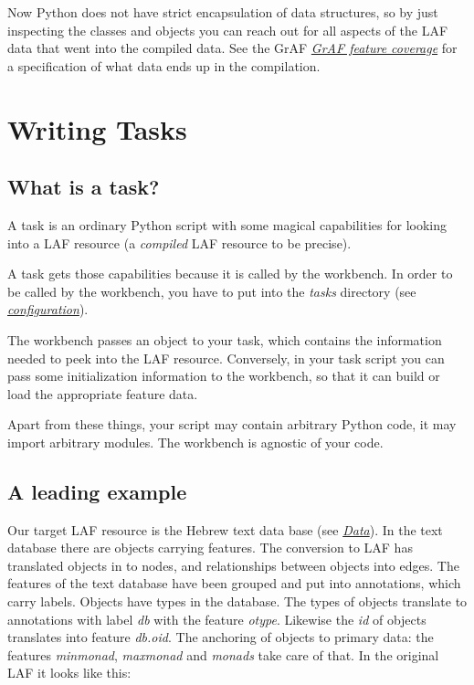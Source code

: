 \documentclass[letterpaper,10pt,english]{sphinxmanual}
\begin{document}
Now Python does not have strict encapsulation of data structures,
so by just inspecting the classes and objects you can reach out
for all aspects of the LAF data that went into the compiled data.
See the GrAF {\hyperref[workbench:feature-coverage]{\emph{GrAF feature coverage}}} for a specification of what data ends up in the compilation.


\chapter{Writing Tasks}
\label{taskwriting:writing-tasks}\label{taskwriting::doc}

\section{What is a task?}
\label{taskwriting:what-is-a-task}
A task is an ordinary Python script with some magical capabilities
for looking into a LAF resource (a \emph{compiled} LAF resource to be precise).

A task gets those capabilities because it is called by the workbench.
In order to be called by the workbench, you have to put into the \emph{tasks} directory
(see {\hyperref[workbench:task-dir]{\emph{configuration}}}).

The workbench passes an object to your task,
which contains the information needed to peek into the LAF resource.
Conversely, in your task script you can pass some initialization information to the workbench,
so that it can build or load the appropriate feature data.

Apart from these things, your script may contain arbitrary Python code,
it may import arbitrary modules.
The workbench is agnostic of your code.


\section{A leading example}
\label{taskwriting:a-leading-example}
Our target LAF resource is the Hebrew text data base (see {\hyperref[overview:data]{\emph{Data}}}).
In the text database there are objects carrying features.
The conversion to LAF has translated objects in to nodes, and relationships between objects into edges.
The features of the text database have been grouped and put into annotations, which carry labels.
Objects have types in the database.
The types of objects translate to annotations with label \emph{db} with the feature \emph{otype}.
Likewise the \emph{id} of objects translates into feature \emph{db.oid}.
The anchoring of objects to primary data: the features \emph{minmonad}, \emph{maxmonad} and \emph{monads} take care of that.
In the original LAF it looks like this:
\end{document}
